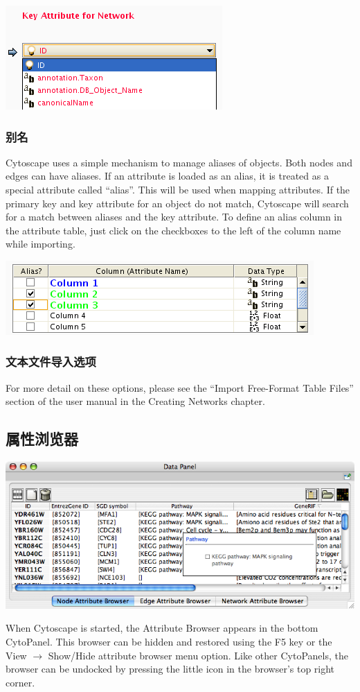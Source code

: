 \includegraphics[width=.3\textwidth]{images/attribute_table_import_keyattr.png} 
 
\subsubsection{别名}
Cytoscape uses a simple mechanism to manage aliases of objects. Both nodes and
edges can have aliases. If an attribute is loaded as an alias, it is treated as
a special attribute called ``alias''. This will be used when mapping
attributes. If the primary key and key attribute for an object do not match,
Cytoscape will search for a match between aliases and the key attribute. To
define an alias column in the attribute table, just click on the checkboxes to
the left of the column name while importing. 

\includegraphics[width=.3\textwidth]{images/attribute_table_import_alias.png} 
 
\subsubsection{文本文件导入选项}
For more detail on these options, please see the ``Import Free-Format Table
Files'' section of the user manual in the Creating Networks chapter. 

\subsection{属性浏览器}
\includegraphics[width=.5\textwidth]{images/attribute_browser26.png} 
 
When Cytoscape is started, the Attribute Browser appears in the bottom
CytoPanel. This browser can be hidden and restored using the F5 key or the View
$\rightarrow$ Show/Hide attribute browser menu option. Like other CytoPanels, the
browser can be undocked by pressing the little icon in the browser's
top right corner. 


